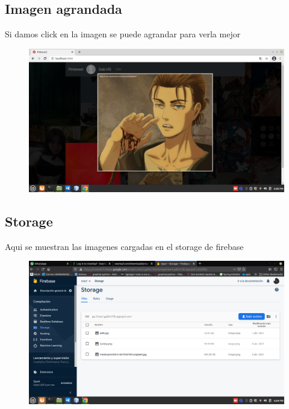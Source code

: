 \documentclass[60pt]{article}
\begin{document}
\subsection{Imagen agrandada}
Si damos click en la imagen se puede agrandar para verla mejor
\begin{figure}[htb]
\centering
\includegraphics[width=1\linewidth]{imagenGrande.png}
\end{figure}

\subsection{Storage}
Aqui se muestran las imagenes cargadas en el storage de firebase
\begin{figure}[htb]
\centering
\includegraphics[width=1\linewidth]{storage.png}
\end{figure}
\end{document}
